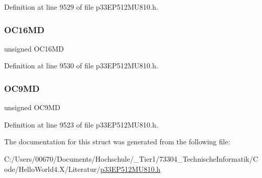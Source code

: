 Definition at line 9529 of file p33\+E\+P512\+M\+U810.\+h.

\mbox{\label{structtag_p_m_d5_b_i_t_s_ad46d9cd84af470aec18149f9817b2472}} 
\subsubsection{\texorpdfstring{O\+C16\+MD}{OC16MD}}
{\footnotesize\ttfamily unsigned O\+C16\+MD}



Definition at line 9530 of file p33\+E\+P512\+M\+U810.\+h.

\mbox{\label{structtag_p_m_d5_b_i_t_s_a7461ca8b7aab2ade615a67122dc1edbe}} 
\subsubsection{\texorpdfstring{O\+C9\+MD}{OC9MD}}
{\footnotesize\ttfamily unsigned O\+C9\+MD}



Definition at line 9523 of file p33\+E\+P512\+M\+U810.\+h.



The documentation for this struct was generated from the following file\+:\begin{DoxyCompactItemize}
\item 
C\+:/\+Users/00670/\+Documents/\+Hochschule/\+\_\+\+Tier1/73304\+\_\+\+Technische\+Informatik/\+Code/\+Hello\+World4.\+X/\+Literatur/\hyperlink{p33_e_p512_m_u810_8h}{p33\+E\+P512\+M\+U810.\+h}\end{DoxyCompactItemize}

